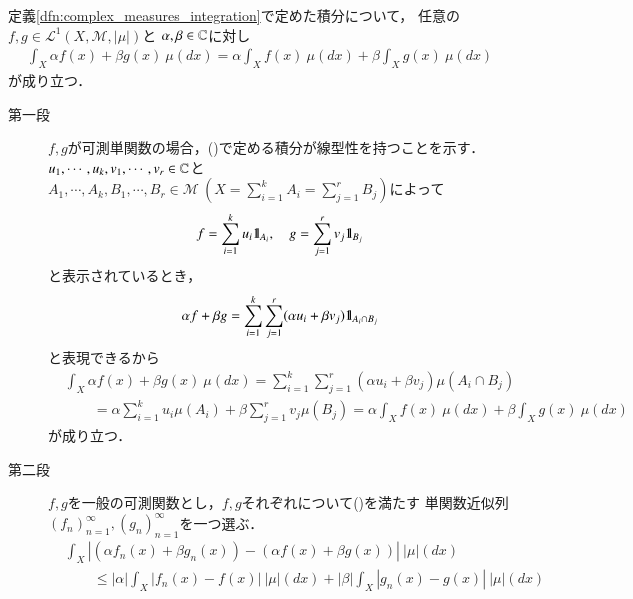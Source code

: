 	\begin{screen}
		\begin{thm}[積分の線型性]
			定義\ref{dfn:complex_measures_integration}で定めた積分について，
			任意の$f,g \in \mathscr{L}^1(X,\mathcal{M},|\mu|)$と
			$\alpha,\beta \in \mathbb{C}$に対し
			\begin{align}
				\int_X \alpha f(x) + \beta g(x)\ \mu(dx)
				= \alpha \int_X f(x)\ \mu(dx) + \beta \int_X g(x)\ \mu(dx)
			\end{align}
			が成り立つ．
		\end{thm}
	\end{screen}
	
	\begin{prf}\mbox{}
		\begin{description}
			\item[第一段]
				$f,g$が可測単関数の場合，()で定める積分が線型性を持つことを示す．
				$u_1,\cdots,u_k,v_1,\cdots,v_r \in \mathbb{C}$と$A_1,\cdots,A_k,B_1,\cdots,B_r \in \mathcal{M}\ (X = \sum_{i=1}^{k} A_i = \sum_{j=1}^{r} B_j)$によって
				\begin{align}
					f = \sum_{i=1}^{k} u_i \mbox{1}\hspace{-0.25em}\mbox{l}_{A_i},
					\quad g = \sum_{j=1}^{r} v_j \mbox{1}\hspace{-0.25em}\mbox{l}_{B_j}
				\end{align}
				と表示されているとき，
				\begin{align}
					\alpha f + \beta g = \sum_{i=1}^{k} \sum_{j=1}^{r} (\alpha u_i + \beta v_j) \mbox{1}\hspace{-0.25em}\mbox{l}_{A_i \cap B_j}
				\end{align}
				と表現できるから
				\begin{align}
					&\int_X \alpha f(x) + \beta g(x)\ \mu(dx) 
					= \sum_{i=1}^{k} \sum_{j=1}^{r} (\alpha u_i + \beta v_j) \mu(A_i \cap B_j) \\
					&\qquad = \alpha \sum_{i=1}^{k} u_i \mu(A_i) + \beta \sum_{j=1}^{r} v_j \mu(B_j)
					= \alpha \int_X f(x)\ \mu(dx) + \beta \int_X g(x)\ \mu(dx)
				\end{align}
				が成り立つ．
			\item[第二段]
				$f,g$を一般の可測関数とし，$f,g$それぞれについて()を満たす
				単関数近似列$(f_n)_{n=1}^{\infty},(g_n)_{n=1}^{\infty}$を一つ選ぶ．
				\begin{align}
					&\int_X \left|(\alpha f_n(x) + \beta g_n(x)) - (\alpha f(x) + \beta g(x)) \right|\ |\mu|(dx) \\
					&\qquad \leq |\alpha| \int_X \left| f_n(x) - f(x) \right|\ |\mu|(dx)
						+ |\beta| \int_X \left| g_n(x) - g(x) \right|\ |\mu|(dx)

\end{align}
\end{description}
\end{prf}

